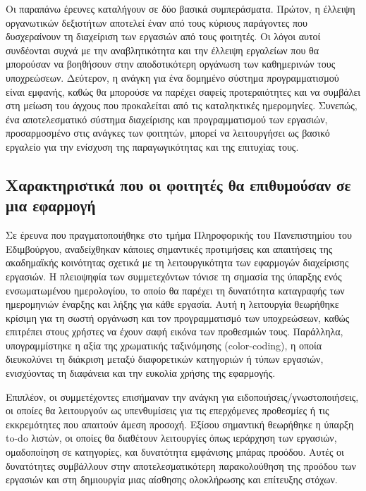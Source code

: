             Οι παραπάνω έρευνες καταλήγουν σε δύο βασικά συμπεράσματα. Πρώτον, η έλλειψη οργανωτικών δεξιοτήτων αποτελεί έναν από τους κύριους παράγοντες που δυσχεραίνουν τη διαχείριση των εργασιών από τους φοιτητές. Οι λόγοι αυτοί συνδέονται συχνά με την αναβλητικότητα και την έλλειψη εργαλείων που θα μπορούσαν να βοηθήσουν στην αποδοτικότερη οργάνωση των καθημερινών τους υποχρεώσεων. Δεύτερον, η ανάγκη για ένα δομημένο σύστημα προγραμματισμού είναι εμφανής, καθώς θα μπορούσε να παρέχει σαφείς προτεραιότητες και να συμβάλει στη μείωση του άγχους που προκαλείται από τις καταληκτικές ημερομηνίες. Συνεπώς, ένα αποτελεσματικό σύστημα διαχείρισης και προγραμματισμού των εργασιών, προσαρμοσμένο στις ανάγκες των φοιτητών, μπορεί να λειτουργήσει ως βασικό εργαλείο για την ενίσχυση της παραγωγικότητας και της επιτυχίας τους.

        \subsection{Χαρακτηριστικά που οι φοιτητές θα επιθυμούσαν σε μια εφαρμογή} \label{sec:student_preferences}
            Σε έρευνα \cite{Trujillo2020} που πραγματοποιήθηκε στο τμήμα Πληροφορικής του Πανεπιστημίου του Εδιμβούργου, αναδείχθηκαν κάποιες σημαντικές προτιμήσεις και απαιτήσεις της ακαδημαϊκής κοινότητας σχετικά με τη λειτουργικότητα των εφαρμογών διαχείρισης εργασιών. Η πλειοψηφία των συμμετεχόντων τόνισε τη σημασία της ύπαρξης ενός ενσωματωμένου ημερολογίου, το οποίο θα παρέχει τη δυνατότητα καταγραφής των ημερομηνιών έναρξης και λήξης για κάθε εργασία. Αυτή η λειτουργία θεωρήθηκε κρίσιμη για τη σωστή οργάνωση και τον προγραμματισμό των υποχρεώσεων, καθώς επιτρέπει στους χρήστες να έχουν σαφή εικόνα των προθεσμιών τους. Παράλληλα, υπογραμμίστηκε η αξία της χρωματικής ταξινόμησης (color-coding), η οποία διευκολύνει τη διάκριση μεταξύ διαφορετικών κατηγοριών ή τύπων εργασιών, ενισχύοντας τη διαφάνεια και την ευκολία χρήσης της εφαρμογής.

            Επιπλέον, οι συμμετέχοντες επισήμαναν την ανάγκη για ειδοποιήσεις/γνωστοποιήσεις, οι οποίες θα λειτουργούν ως υπενθυμίσεις για τις επερχόμενες προθεσμίες ή τις εκκρεμότητες που απαιτούν άμεση προσοχή. Εξίσου σημαντική θεωρήθηκε η ύπαρξη to-do λιστών, οι οποίες θα διαθέτουν λειτουργίες όπως ιεράρχηση των εργασιών, ομαδοποίηση σε κατηγορίες, και δυνατότητα εμφάνισης μπάρας προόδου. Αυτές οι δυνατότητες συμβάλλουν στην αποτελεσματικότερη παρακολούθηση της προόδου των εργασιών και στη δημιουργία μιας αίσθησης ολοκλήρωσης και επίτευξης στόχων.

